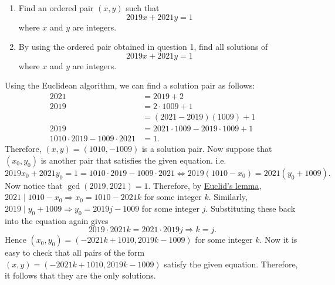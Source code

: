 \begin{question}
    \begin{enumerate}
        \item Find an ordered pair $(x,y)$ such that \[2019x + 2021y = 1\]
            where $x$ and $y$ are integers. 

        \item By using the ordered pair obtained in question 1, find all
            solutions of \[2019x + 2021y = 1\] where $x$ and $y$ are integers. 
    \end{enumerate}
\end{question}
\begin{solution}
    Using the Euclidean algorithm, we can find a solution pair as follows:
    \begin{align*}
        2021 &= 2019 + 2\\
        2019 &= 2 \cdot 1009 + 1\\
        &= (2021 - 2019)(1009) + 1\\
        2019 &= 2021 \cdot 1009 - 2019 \cdot 1009 + 1\\
        1010 \cdot 2019 - 1009 \cdot 2021 &= 1.
    \end{align*}
    Therefore, $(x, y) = (1010, -1009)$ is a solution pair. Now suppose that
    $(x_0, y_0)$ is another pair that satisfies the given equation. i.e.
    \[ 2019x_0 + 2021y_0 = 1 = 1010 \cdot 2019 - 1009 \cdot 2021
    \Longleftrightarrow 2019(1010 - x_0) = 2021(y_0 + 1009). \]
    Now notice that $\gcd(2019, 2021) = 1$. Therefore, by \hyperref[lem:
    euclid]{Euclid's lemma}, $2021 \mid 1010 - x_0 \Rightarrow x_0 = 1010 -
    2021k$ for some integer $k$. Similarly, $2019 \mid y_0 + 1009 \Rightarrow
    y_0 = 2019j - 1009$ for some integer $j$. Substituting these back into the
    equation again gives
    \[ 2019 \cdot 2021 k = 2021 \cdot 2019 j \Longrightarrow k = j. \]
    Hence $(x_0, y_0) = (-2021k + 1010, 2019k - 1009)$ for some integer $k$.
    Now it is easy to check that all pairs of the form $(x, y) = (-2021k +
    1010, 2019k - 1009)$ satisfy the given equation. Therefore, it follows that
    they are the only solutions.
\end{solution}

